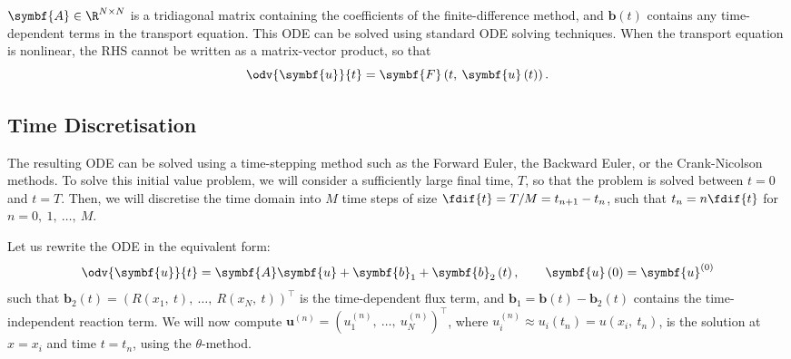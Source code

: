 \documentclass{article}
\begin{document}
\(\symbf{A} \in \R^{N \times N}\) is a tridiagonal matrix containing
the coefficients of the finite-difference method, and
\(\symbf{b}\left( t \right)\) contains any time-dependent terms in the
transport equation. This ODE can be solved using standard ODE solving
techniques. When the transport equation is nonlinear, the RHS cannot
be written as a matrix-vector product, so that
\begin{equation*}
    \odv{\symbf{u}}{t} = \symbf{F}\left( t,\: \symbf{u}\left( t \right) \right).
\end{equation*}
\subsection{Time Discretisation}
The resulting ODE can be solved using a time-stepping method such as
the Forward Euler, the Backward Euler, or the Crank-Nicolson methods.
To solve this initial value problem, we will consider a sufficiently
large final time, \(T\), so that the problem is solved between \(t =
0\) and \(t = T\). Then, we will discretise the time domain into \(M\)
time steps of size \(\fdif{t} = T/M = t_{n+1} - t_n\), such that \(t_n
= n \fdif{t}\) for \(n = 0,\: 1,\: \ldots,\: M\).

Let us rewrite the ODE in the equivalent form:
\begin{equation*}
    \odv{\symbf{u}}{t} = \symbf{A} \symbf{u} + \symbf{b}_1 + \symbf{b}_2\left( t \right), \qquad \symbf{u}\left( 0 \right) = \symbf{u}^{\left( 0 \right)}
\end{equation*}
such that \(\symbf{b}_2\left( t \right) = {\left( R\left( x_1,\: t \right),\: \dots,\: R\left( x_N,\: t \right) \right)}^\top\)
is the time-dependent flux term, and \(\symbf{b}_1 = \symbf{b}\left( t \right) - \symbf{b}_2\left( t \right)\)
contains the time-independent reaction term. We will now compute
\(\symbf{u}^{\left( n \right)} = {\left( u_1^{\left( n \right)},\: \dots,\: u_N^{\left( n \right)} \right)}^\top\),
where \(u_i^{\left( n \right)} \approx u_i\left( t_n \right) = u\left( x_i,\: t_n \right)\),
is the solution at \(x = x_i\) and time \(t = t_n\), using the
\(\theta\)-method.
\end{document}
